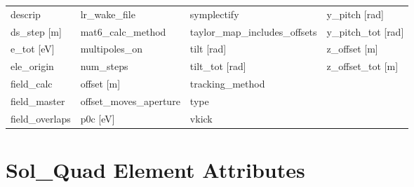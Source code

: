 \begin{tabular}{llll}
descrip                          & lr_wake_file                     & symplectify                      & y_pitch [rad]                    \\
ds_step [m]                      & mat6_calc_method                 & taylor_map_includes_offsets      & y_pitch_tot [rad]                \\
e_tot [eV]                       & multipoles_on                    & tilt [rad]                       & z_offset [m]                     \\
ele_origin                       & num_steps                        & tilt_tot [rad]                   & z_offset_tot [m]                 \\
field_calc                       & offset [m]                       & tracking_method                  &                                  \\
field_master                     & offset_moves_aperture            & type                             &                                  \\
field_overlaps                   & p0c [eV]                         & vkick                            &                                  \\
 \bottomrule
 \end{tabular}
 \vfill
 
 \section{Sol_Quad Element Attributes}
 \label{s:list.sol.quad}
 
